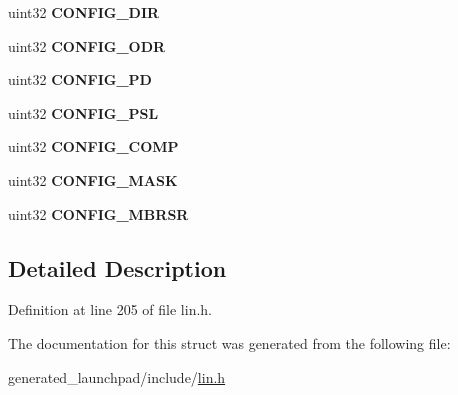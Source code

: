 \begin{DoxyCompactItemize}
\mbox{\label{structlin__config__reg_a692b7a74f7a4ada5012961a974df8b37}} 
uint32 {\bfseries C\+O\+N\+F\+I\+G\+\_\+\+D\+IR}
\item 
\mbox{\label{structlin__config__reg_ad2cdf4e5195b16477c9b567d5e0f2d9f}} 
uint32 {\bfseries C\+O\+N\+F\+I\+G\+\_\+\+O\+DR}
\item 
\mbox{\label{structlin__config__reg_a25573fef952d863a51133b9981c1e5f4}} 
uint32 {\bfseries C\+O\+N\+F\+I\+G\+\_\+\+PD}
\item 
\mbox{\label{structlin__config__reg_a77e2da3786f4e90d970ec5522cf4666d}} 
uint32 {\bfseries C\+O\+N\+F\+I\+G\+\_\+\+P\+SL}
\item 
\mbox{\label{structlin__config__reg_a0a495290fb7e18d895ddbbfd05b5157d}} 
uint32 {\bfseries C\+O\+N\+F\+I\+G\+\_\+\+C\+O\+MP}
\item 
\mbox{\label{structlin__config__reg_a65e40875afa2d72e638c30baa2fa0af2}} 
uint32 {\bfseries C\+O\+N\+F\+I\+G\+\_\+\+M\+A\+SK}
\item 
\mbox{\label{structlin__config__reg_afed38f5b17743e190323b2485430ec10}} 
uint32 {\bfseries C\+O\+N\+F\+I\+G\+\_\+\+M\+B\+R\+SR}
\end{DoxyCompactItemize}


\subsection{Detailed Description}


Definition at line 205 of file lin.\+h.



The documentation for this struct was generated from the following file\+:\begin{DoxyCompactItemize}
\item 
generated\+\_\+launchpad/include/\mbox{\hyperlink{lin_8h}{lin.\+h}}\end{DoxyCompactItemize}
